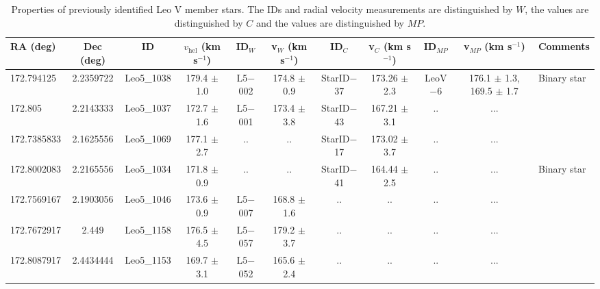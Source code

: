 \begin{table*}[ht]
\centering
\notsotiny
\centering
\caption{Properties of previously identified Leo V member stars. The \citet{wal2009} IDs and radial velocity measurements are distinguished by $W$, the \citet{col2017} values are distinguished by $C$ and the \citet{mut2020} values are distinguished by $MP$. \label{tab:table_leov_previousmembers}} 
\begin{tabular}{lcccccccccl}
\hline
\hline
 RA (deg) & Dec (deg) & ID & $v_\mathrm{hel}$ (km s$^{-1}$) & ID$_W$ & v$_W$ (km s$^{-1}$) & ID$_C$ & v$_C$ (km s$^{-1}$) & ID$_{MP}$ & v$_{MP}$ (km s$^{-1}$) & Comments\\
\hline
 172.794125 & 2.2359722 & Leo5\_1038 & 179.4 $\pm$ 1.0 & L5$-$002 & 174.8 $\pm$ 0.9 & StarID$-$37 & 173.26 $\pm$ 2.3 & LeoV$-$6 & 176.1 $\pm$ 1.3, 169.5 $\pm$ 1.7 & Binary star\\
 172.805 & 2.2143333 & Leo5\_1037 & 172.7 $\pm$ 1.6 & L5$-$001 & 173.4 $\pm$ 3.8 & StarID$-$43 & 167.21 $\pm$ 3.1 & ..  & ... & \\
  172.7385833 & 2.1625556 & Leo5\_1069 & 177.1 $\pm$ 2.7 & .. & .. & StarID$-$17 & 173.02 $\pm$ 3.7 & ..  & ... & \\
 172.8002083 & 2.2165556 & Leo5\_1034 & 171.8 $\pm$ 0.9 & .. & .. & StarID$-$41 & 164.44 $\pm$ 2.5 & ..  & ... & Binary star\\
  172.7569167 & 2.1903056 & Leo5\_1046 & 173.6 $\pm$ 0.9 & L5$-$007 & 168.8 $\pm$ 1.6 & .. & .. & ..  & ... &  \\
 172.7672917 & 2.449 & Leo5\_1158 & 176.5 $\pm$ 4.5 & L5$-$057 & 179.2 $\pm$ 3.7 & .. & .. & ..  & ... & \\
 172.8087917 & 2.4434444 & Leo5\_1153 & 169.7 $\pm$ 3.1 & L5$-$052 & 165.6 $\pm$ 2.4 & .. & .. & ..  & ... & \\
\hline
\end{tabular}
\end{table*}